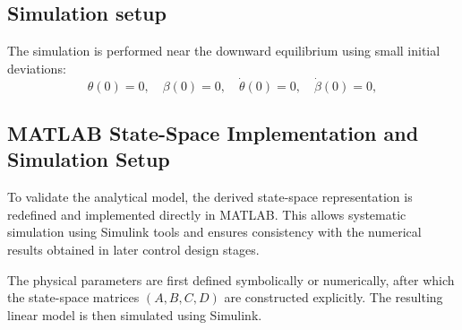 \documentclass[12pt,a4paper]{article}
\begin{document}
\subsection{Simulation setup}

The simulation is performed near the downward equilibrium using small initial deviations:
\[
\theta(0)=0,\quad \beta(0)=0,\quad \dot\theta(0)=0,\quad \dot\beta(0)=0,
\]

\subsection{MATLAB State-Space Implementation and Simulation Setup}

To validate the analytical model, the derived state-space representation is redefined and implemented directly in \textsc{MATLAB}. This allows systematic simulation using Simulink tools and ensures consistency with the numerical results obtained in later control design stages.

The physical parameters are first defined symbolically or numerically, after which the state-space matrices $(A,B,C,D)$ are constructed explicitly. The resulting linear model is then simulated using Simulink.
\end{document}
